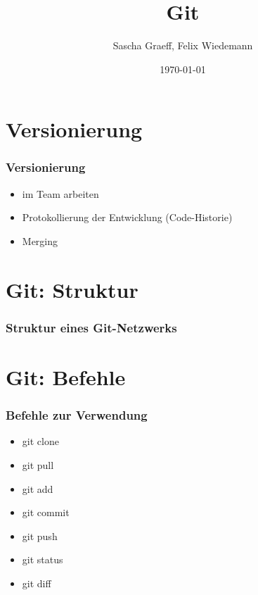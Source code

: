 \documentclass{beamer}
\title{Git}
\author{Sascha Graeff, Felix Wiedemann}
\date{\today}
\begin{document}
\maketitle
\frame{\tableofcontents}
 
\section{Versionierung}
\begin{frame} 
  \frametitle{Versionierung}
  \begin{itemize}
    \item im Team arbeiten
    \item Protokollierung der Entwicklung (Code-Historie)
    \item Merging
  \end{itemize}
\end{frame}

\section{Git: Struktur}
\begin{frame}
  \frametitle{Struktur eines Git-Netzwerks}
\end{frame}

\section{Git: Befehle}
\begin{frame}
  \frametitle{Befehle zur Verwendung}\pause
  \begin{itemize}
     \item git clone \pause
     \item git pull \pause
     \item git add \pause
     \item git commit \pause
     \item git push \pause
     \item git status \pause
     \item git diff
  \end{itemize}
\end{frame}
\end{document}
